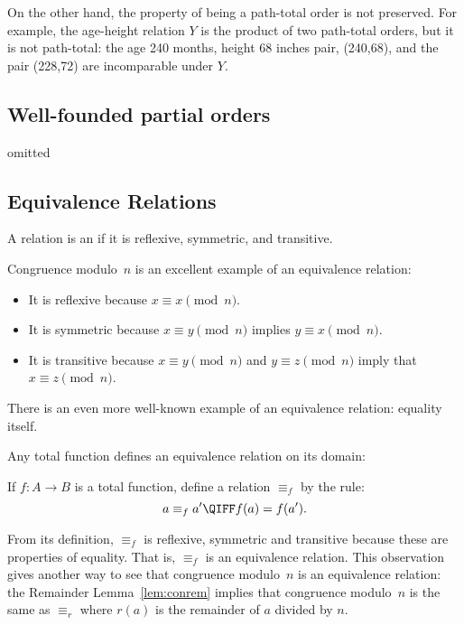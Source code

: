On the other hand, the property of being a path-total order is not preserved.
For example, the age-height relation $Y$ is the product of two path-total
orders, but it is not path-total: the age 240 months, height 68 inches pair,
(240,68), and the pair (228,72) are incomparable under $Y$.

\begin{problems}

\classproblems
{}

\end{problems}

\begin{editingnotes}
\chapter*{Well-founded partial orders}
omitted
\end{editingnotes}

\section{Equivalence Relations}\label{equiv_rel_sec}
\begin{definition}
A relation is an  if it is reflexive,
symmetric, and transitive.
\end{definition}

Congruence modulo~$n$ is an excellent example of an equivalence
relation:
\begin{itemize}

\item
It is reflexive because $x \equiv x \pmod{n}$.

\item
It is symmetric because $x \equiv y \pmod{n}$ implies $y \equiv x
\pmod{n}$.

\item
It is transitive because $x \equiv y \pmod{n}$ and $y \equiv z
\pmod{n}$ imply that $x \equiv z \pmod{n}$.

\end{itemize}
There is an even more well-known example of an equivalence relation:
equality itself.

Any total function defines an equivalence relation on its domain:
\begin{definition}\label{equiv_f}
If $f:A \to B$ is a total function, define a relation $\equiv_f$ by the rule:
\[
a \equiv_f a'  \QIFF f(a) = f(a').
\]
\end{definition}
From its definition, $\equiv_f$ is reflexive, symmetric and transitive
because these are properties of equality.  That is, $\equiv_f$ is an
equivalence relation.  This observation gives another way to see that
congruence modulo~$n$ is an equivalence relation: the Remainder
Lemma~\ref{lem:conrem} implies that congruence modulo~$n$ is the same
as $\equiv_r$ where $r(a)$ is the remainder of $a$ divided by $n$.


